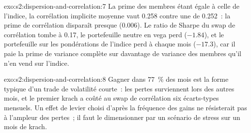 \begin{solution}{exo:s2:dispersion-and-correlation:7}
La prime des membres étant égale à celle de l'indice, la corrélation implicite moyenne vaut 0.258 contre une  de 0.252~: la prime de corrélation disparaît presque
(0.006). Le ratio de Sharpe du swap de corrélation tombe à 0.17, le portefeuille neutre en vega perd ($-1.84$), et le portefeuille sur les pondérations de l'indice perd à chaque mois
($-17.3$), car il paie la prime de variance complète sur davantage de variance des membres qu'il n'en vend sur l'indice.
\end{solution}

\begin{solution}{exo:s2:dispersion-and-correlation:8}
Gagner dans 77~\% des mois est la forme typique d'un trade de volatilité courte~: les pertes surviennent lors des autres mois, et le premier krach a coûté au swap de corrélation six
écarts-types mensuels. Un effet de levier choisi d'après la fréquence des gains ne résisterait pas à l'ampleur des pertes~; il faut le dimensionner par un scénario de stress sur un mois de krach.
\end{solution}

